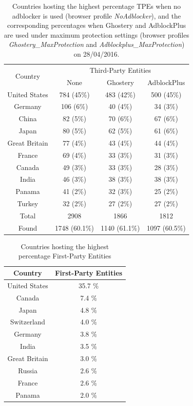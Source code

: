 \begin{table}
  \centering
  \begin{tabular}{|c|c|c|c|}
  \hline
  \multirow{2}{*}{Country} & \multicolumn{3}{|c|}{Third-Party Entities} \\
  \cline{2-4}
  & \scriptsize{None} & \scriptsize{Ghostery} & \scriptsize{AdblockPlus} \\
  \hline
  United States & 784 (45\%) & 483 (42\%) & 500 (45\%) \\
  Germany & 106 (6\%) & 40 (4\%) & 34 (3\%) \\
  China & 82 (5\%) & 70 (6\%) & 67 (6\%) \\
  Japan & 80 (5\%) & 62 (5\%) & 61 (6\%) \\
  Great Britain & 77 (4\%) & 43 (4\%) & 44 (4\%) \\
  France & 69 (4\%) & 33 (3\%) & 31 (3\%) \\
  Canada & 49 (3\%) & 33 (3\%) & 28 (3\%) \\
  India & 46 (3\%) & 38 (3\%) & 38 (3\%) \\
  Panama & 41 (2\%) & 32 (3\%) & 25 (2\%) \\
  Turkey & 32 (2\%) & 27 (2\%) & 27 (2\%) \\
  \hline
  Total & 2908 & 1866 & 1812 \\
  Found & 1748 (60.1\%) & 1140 (61.1\%) & 1097 (60.5\%) \\
  \hline
  \end{tabular}
  \caption{Countries hosting the highest percentage TPEs when no adblocker is used (browser profile \textit{NoAdblocker}), and the corresponding percentages when Ghostery and AdblockPlus are used under maximum protection settings (browser profiles \textit{Ghostery\_MaxProtection} and \textit{Adblockplus\_MaxProtection}) on 28/04/2016.}
  \label{table:top_10_third_party_countries}
  \end{table}
  
  \begin{table}
  \centering
  \begin{tabular}{|c|c|}
  \hline
  Country & First-Party Entities \\
  \hline
  United States & 35.7 \% \\
  Canada & 7.4 \% \\
  Japan & 4.8 \% \\
  Switzerland & 4.0 \% \\
  Germany & 3.8 \% \\
  India & 3.5 \% \\
  Great Britain & 3.0 \% \\
  Russia & 2.6 \% \\
  France & 2.6 \% \\
  Panama & 2.0 \% \\
  \hline
  \end{tabular}
  \caption{Countries hosting the highest percentage First-Party Entities}
  \label{table:top_10_first_party_countries}
  \end{table}
  


